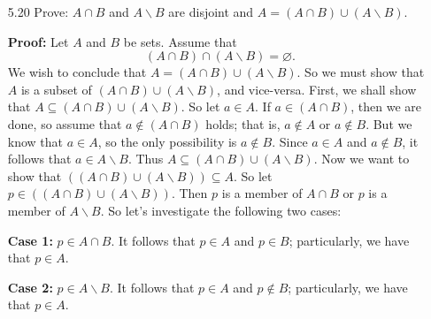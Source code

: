 \begin{enumerate}
      \textbf{Proof:} Let $A$, $B$, and $U$ be sets. Assume that
      $$U = A \cup B \mbox{ and } A \cap B = \varnothing.$$
      We wish to conclude that $A = U{\backslash}B$. To accomplish this, we must
      show that $A \subseteq U{\backslash}B$ and $U{\backslash}B \subseteq A$.
      First, we shall show that $A \subseteq U{\backslash}B$. So let $a \in A$.
      Since $U$ is the union of $A$ and $B$, it follows that $a \in U$. Now
      since $A$ and $B$ are disjoint, we must have that $a \notin B$. We have
      shown that $a \in U$ and $a \notin B$, so that $a \in U{\backslash}B$.
      Thus $A \subseteq U{\backslash}B$. To complete the proof, we must now show
      that $U{\backslash}B \subseteq A$. So let $u \in U{\backslash}B$. That is,
      $u \in U$ and $u \notin B$. By assumption, every element in $U$ must be
      in at least one of $A$ and $B$; since $u$ is not in $B$, it must be in
      $A$, so that $U{\backslash}B \subseteq A$. Thus $A= U{\backslash}B$. \qed
   \item[5.20] Prove: $A \cap B$ and $A{\backslash}B$ are disjoint and
               $A = (A \cap B) \cup (A{\backslash}B)$.
               
      \textbf{Proof:} Let $A$ and $B$ be sets. Assume that
      $$(A \cap B) \cap (A{\backslash}B) = \varnothing.$$
      We wish to conclude that $A = (A \cap B) \cup (A{\backslash}B)$. So we
      must show that $A$ is a subset of $(A \cap B) \cup (A{\backslash}B)$, and
      vice-versa. First, we shall show that
      $A \subseteq (A \cap B) \cup (A{\backslash}B)$. So let $a \in A$. If
      $a \in (A \cap B)$, then we are done, so assume that
      $a \notin (A \cap B)$ holds; that is, $a \notin A$ or $a \notin B$. But
      we know that $a \in A$, so the only possibility is $a \notin B$. Since
      $a \in A$ and $a \notin B$, it follows that $a \in A{\backslash}B$. Thus
      $A \subseteq (A \cap B) \cup (A{\backslash}B)$. Now we want to show that
      $((A \cap B) \cup (A{\backslash}B)) \subseteq A$. So let
      $p \in ((A \cap B) \cup (A{\backslash}B))$. Then $p$ is a member of
      $A \cap B$ or $p$ is a member of $A{\backslash}B$. So let's investigate
      the following two cases:
      
      \textbf{Case 1:} $p \in A \cap B$. It follows that $p \in A$ and
      $p \in B$; particularly, we have that $p \in A$.
      
      \textbf{Case 2:} $p \in A{\backslash}B$. It follows that $p \in A$ and
      $p \notin B$; particularly, we have that $p \in A$.
      

\end{enumerate}
